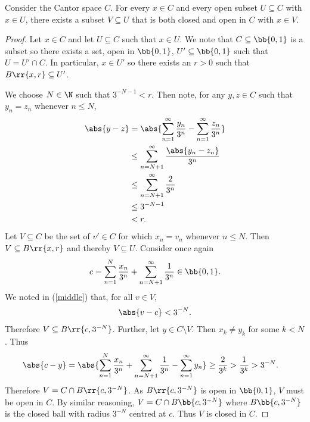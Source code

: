 \documentclass{article}
\begin{document}
\begin{claim*}[2d]
  Consider the Cantor space $C$. For every $x\in C$ and every open subset $U\subseteq C$
  with $x\in U$, there exists a subset $V\subseteq U$ that is both closed and open in $C$
  with $x\in V$.
  \begin{proof}
    Let $x\in C$ and let $U\subseteq C$ such that $x\in U$. We note that $C\subseteq\bb{0,1}$
    is a subset so there exists a set, open in $\bb{0,1}$, $U'\subseteq\bb{0,1}$ such that
    $U=U'\cap C$. In particular, $x\in U'$ so there exists an $r>0$ such that $B\rr{x,r}\subseteq U'$.

    We choose $N\in\N$ such that $3^{-N-1}<r$. Then note, for any $y,z\in C$ such that
    $y_n=z_n$ whenever $n\leq N$,
    \begin{align*}
      \abs{y-z} &= \abs{\sum_{n=1}^{\infty} \frac{y_n}{3^n} - \sum_{n=1}^{\infty} \frac{z_n}{3^n}} \\
                &\leq \sum_{n=N+1}^{\infty} \frac{\abs{y_n-z_n}}{3^n} \\
                &\leq \sum_{n=N+1}^{\infty} \frac{2}{3^n} \\
                &\leq 3^{-N-1} \\
                &<r.
    \end{align*}
    Let $V\subseteq C$ be the set of $v'\in C$ for which $x_n=v_n$ whenever $n\leq N$.
    Then $V\subseteq B\rr{x,r}$ and thereby $V\subseteq U$. Consider once again
    \begin{align*}
      c=\sum_{n=1}^{N} \frac{x_n}{3^n} + \sum_{n=N+1}^{\infty} \frac{1}{3^n} \in \bb{0,1}.
    \end{align*}
    We noted in (\ref{middle}) that, for all $v\in V$,
    \begin{align*}
      \abs{v-c}<3^{-N}.
    \end{align*}
    Therefore $V\subseteq B\rr{c,3^{-N}}$. Further, let $y\in C\setminus V$. Then
    $x_k\neq y_k$ for some $k<N$. Thus
    \begin{align*}
      \abs{c-y} &= \abs{\sum_{n=1}^{N} \frac{x_n}{3^n}+\sum_{n=N+1}^{\infty} \frac{1}{3^n} - \sum_{n=1}^{\infty} y_n}
      \geq \frac{2}{3^k} > \frac{1}{3^k} > 3^{-N}.
    \end{align*}
    Therefore $V=C\cap B\rr{c,3^{-N}}$. As $B\rr{c,3^{-N}}$ is open in $\bb{0,1}$, $V$ must be open in $C$.
    By similar reasoning, $V=C\cap B\bb{c,3^{-N}}$ where $B\bb{c,3^{-N}}$ is the closed ball with radius $3^{-N}$
    centred at $c$. Thus $V$ is closed in $C$.
  \end{proof}
\end{claim*}
\end{document}
